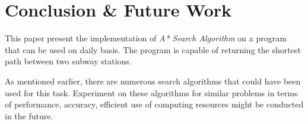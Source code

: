 \documentclass{IEEEtran}
\begin{document}
	
	\section{Conclusion \& Future Work}
	
	This paper present the implementation of \textit{A* Search Algorithm} on a program that can be used on daily basis. The program is capable of returning the shortest path between two subway stations. \newline
	
	As mentioned earlier, there are numerous search algorithms that could have been used for this task. Experiment on these algorithms for similar problems in terms of performance, accuracy, efficient use of computing resources might be conducted in the future.
	
	
	
\end{document}
